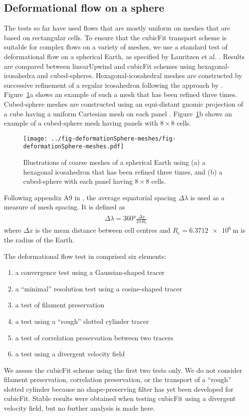 \subsection{Deformational flow on a sphere}
\label{sec:deformationSphere}
The tests so far have used flows that are mostly uniform on meshes that are based on rectangular cells.
To ensure that the cubicFit transport scheme is suitable for complex flows on a variety of meshes, we use a standard test of deformational flow on a spherical Earth, as specified by Lauritzen et al. \citep{lauritzen2012}.  
Results are compared between linearUpwind and cubicFit schemes using hexagonal-icosahedra and cubed-spheres.
Hexagonal-icosahedral meshes are constructed by successive refinement of a regular icosahedron following the approach by \citep{thuburn2014}.
Figure~\ref{fig:sphere-meshes}a shows an example of such a mesh that has been refined three times.
Cubed-sphere meshes are constructed using an equi-distant gnomic projection of a cube having a uniform Cartesian mesh on each panel \citep{staniforth-thuburn2012}.
Figure~\ref{fig:sphere-meshes}b shows an example of a cubed-sphere mesh having panels with $8 \times 8$ cells.

\begin{figure}
	\centering
	\texttt{[image: ../fig-deformationSphere-meshes/fig-deformationSphere-meshes.pdf]}
	\caption{Illustrations of coarse meshes of a spherical Earth using (a) a hexagonal icosahedron that has been refined three times, and (b) a cubed-sphere with each panel having $8 \times 8$ cells.}
	\label{fig:sphere-meshes}
\end{figure}

Following appendix A9 in \citep{lauritzen2014}, the average equatorial spacing $\Delta \lambda$ is used as a measure of mesh spacing.  It is defined as
\begin{align}
	\Delta \lambda = \ang{360} \frac{\overline{\Delta x}}{2 \pi R_e}
\end{align}
where $\overline{\Delta x}$ is the mean distance between cell centres and $R_e = \SI{6.3712e6}{\meter}$ is the radius of the Earth.

The deformational flow test in \citep{lauritzen2012} comprised six elements:
\begin{enumerate}
\item a convergence test using a Gaussian-shaped tracer
\item a ``minimal'' resolution test using a cosine-shaped tracer
\item a test of filament preservation
\item a test using a ``rough'' slotted cylinder tracer
\item a test of correlation preservation between two tracers
\item a test using a divergent velocity field
\end{enumerate}
We assess the cubicFit scheme using the first two tests only.  We do not consider filament preservation, correlation preservation, or the transport of a ``rough'' slotted cylinder because no shape-preserving filter has yet been developed for cubicFit.  Stable results were obtained when testing cubicFit using a divergent velocity field, but no further analysis is made here.

